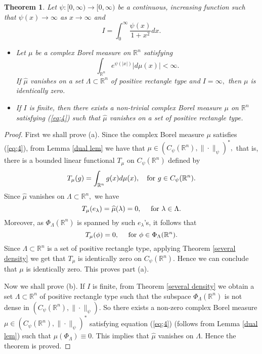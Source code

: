 \documentclass [11pt]{amsart}
\newtheorem{Thm}{Theorem}[section]
\newcommand{\R}{\mathbb R}
\newcommand{\la}{\lambda}
\newcommand{\txt} {\textmd}
\numberwithin{equation}{section}
\begin{document}
\begin{Thm}\label{several beurling}
	Let $\psi:[0,\infty) \rightarrow [0,\infty)$ be a continuous, increasing function such that $\psi(x)\to \infty $ as $x\to \infty$ and
	\begin{equation*}
	I = \int_0^\infty \dfrac{\psi(x)}{1+x^2}dx.
	\end{equation*}
	\begin{itemize}
	\item[(a)] Let $\mu $ be a complex Borel measure on $\R^n$ satisfying 
	\begin{equation}\label{eq;4}
	\int_{\R^n}e^{\psi(|x|)}|d\mu(x)|<\infty.
	\end{equation}
	If $\widehat{\mu}$ vanishes on a set $\Lambda \subset \R^n$ of positive rectangle type and $I=\infty,$ then $\mu $ is identically zero.
	\item[(b)] If $I$ is finite, then there exists a non-trivial complex Borel measure $\mu$ on $\R^n$ satisfying (\ref{eq;4}) such that $\widehat{\mu}$ vanishes on a set of positive rectangle type.	
	\end{itemize}
		\end{Thm}

\begin{proof}
First we shall prove (a). Since the complex Borel measure $\mu$ satisfies (\ref{eq;4}), from Lemma \ref{dual lem} we have that $\mu \in (C_\psi(\R^n),\|\cdot\|_\psi)^*,$ that is,  there is a bounded linear functional $T_{\mu}$ on $C_{\psi}(\R^n)$ defined by
	$$T_\mu(g)=\int_{\R^n}g(x)d\mu(x), \quad \txt{for } g\in C_{\psi}(\R^n).$$  
	Since $\widehat{\mu}$ vanishes on $\Lambda \subset \R^n,$ we have 
	$$T_\mu(e_\la) = \widehat{\mu}(\la) = 0, \quad \txt{ for } \la \in \Lambda.$$ Moreover, as $\Phi_{\Lambda}(\R^n)$ is spanned by such $e_\la$'s, it follows that $$T_\mu(\phi) = 0, \quad \txt{ for } \phi \in \Phi_{\Lambda}(\R^n).$$
Since $\Lambda \subset \R^n$ is a set of positive rectangle type, applying Theorem \ref{several density} we get that $T_\mu$ is identically zero on $C_{\psi}(\R^n).$ Hence we can conclude that $\mu$ is identically zero. This proves part (a).

Now we shall prove (b). If $I$ is finite, from Theorem \ref{several density} we obtain a set $\Lambda \subset \R^n$ of positive rectangle type such that the subspace $\Phi_\Lambda(\R^n)$ is not dense in $(C_\psi(\R^n),\|\cdot\|_\psi).$ So there exists a non-zero complex Borel measure $\mu \in (C_\psi(\R^n),\|\cdot\|_\psi)^*$ satisfying equation (\ref{eq;4}) (follows from Lemma \ref{dual lem}) such that $\mu(\Phi_{\Lambda})\equiv 0.$ This implies that $\widehat{\mu}$ vanishes on $\Lambda.$ Hence the theorem is proved.
\end{proof}
\end{document}
